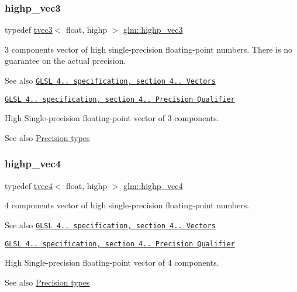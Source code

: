 \subsubsection{\texorpdfstring{highp\+\_\+vec3}{highp\_vec3}}
{\footnotesize\ttfamily typedef \hyperlink{structglm_1_1tvec3}{tvec3}$<$ float, highp $>$ \hyperlink{group__core__precision_ga1ef07d2502ea09b1e63998813a3d4330}{glm\+::highp\+\_\+vec3}}

3 components vector of high single-\/precision floating-\/point numbers. There is no guarantee on the actual precision.

\begin{DoxySeeAlso}{See also}
\href{http://www.opengl.org/registry/doc/GLSLangSpec.4.20.8.pdf}{\tt G\+L\+SL 4.. specification, section 4.. Vectors} 

\href{http://www.opengl.org/registry/doc/GLSLangSpec.4.20.8.pdf}{\tt G\+L\+SL 4.. specification, section 4.. Precision Qualifier}
\end{DoxySeeAlso}
High Single-\/precision floating-\/point vector of 3 components. \begin{DoxySeeAlso}{See also}
\hyperlink{group__core__precision}{Precision types} 
\end{DoxySeeAlso}
\mbox{\label{group__core__precision_ga5f573b0132805b54cb9205eea1c86483}} 
\subsubsection{\texorpdfstring{highp\+\_\+vec4}{highp\_vec4}}
{\footnotesize\ttfamily typedef \hyperlink{structglm_1_1tvec4}{tvec4}$<$ float, highp $>$ \hyperlink{group__core__precision_ga5f573b0132805b54cb9205eea1c86483}{glm\+::highp\+\_\+vec4}}

4 components vector of high single-\/precision floating-\/point numbers.

\begin{DoxySeeAlso}{See also}
\href{http://www.opengl.org/registry/doc/GLSLangSpec.4.20.8.pdf}{\tt G\+L\+SL 4.. specification, section 4.. Vectors} 

\href{http://www.opengl.org/registry/doc/GLSLangSpec.4.20.8.pdf}{\tt G\+L\+SL 4.. specification, section 4.. Precision Qualifier}
\end{DoxySeeAlso}
High Single-\/precision floating-\/point vector of 4 components. \begin{DoxySeeAlso}{See also}
\hyperlink{group__core__precision}{Precision types} 
\end{DoxySeeAlso}
\mbox{\label{group__core__precision_gaf17553233b30d9ed413e822847c4ea8f}} 
